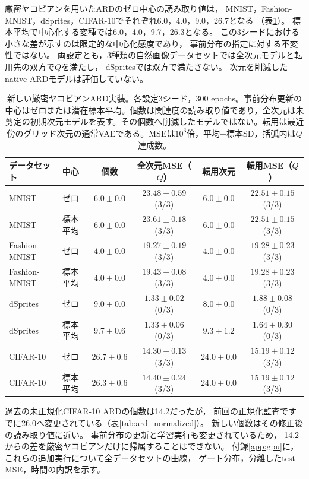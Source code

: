 \documentclass[11pt,a4paper]{ltjsarticle}
\begin{document}
厳密ヤコビアンを用いたARDのゼロ中心の読み取り値は，
MNIST，Fashion-MNIST，dSprites，CIFAR-10でそれぞれ6.0，4.0，9.0，26.7となる
（表\ref{tab:ardnew}）。
標本平均で中心化する変種では6.0，4.0，9.7，26.3となる。
この3シードにおける小さな差が示すのは限定的な中心化感度であり，
事前分布の指定に対する不変性ではない。
両設定とも，3種類の自然画像データセットでは全次元モデルと転用先の双方で$Q$を満たし，
dSpritesでは双方で満たさない。
次元を削減したnative ARDモデルは評価していない。
\begin{table}[H]
\caption{新しい厳密ヤコビアンARD実装。各設定3シード，300 epochs。事前分布更新の中心はゼロまたは潜在標本平均。個数は関連度の読み取り値であり，全次元は未剪定の初期次元モデルを表す。その個数へ削減したモデルではない。転用は最近傍のグリッド次元の通常VAEである。MSEは$10^3$倍，平均$\pm$標本SD，括弧内は$Q$達成数。}\label{tab:ardnew}
\footnotesize
\setlength{\tabcolsep}{3pt}
\begin{tabular*}{\textwidth}{@{\extracolsep{\fill}}llcccc@{}}
\toprule
データセット & 中心 & 個数 & 全次元MSE（$Q$） & 転用次元 & 転用MSE（$Q$） \\
\midrule
MNIST & ゼロ & $6.0 \pm 0.0$ & $23.48 \pm 0.59$ (3/3) & $6.0 \pm 0.0$ & $22.51 \pm 0.15$ (3/3) \\
MNIST & 標本平均 & $6.0 \pm 0.0$ & $23.61 \pm 0.18$ (3/3) & $6.0 \pm 0.0$ & $22.51 \pm 0.15$ (3/3) \\
Fashion-MNIST & ゼロ & $4.0 \pm 0.0$ & $19.27 \pm 0.19$ (3/3) & $4.0 \pm 0.0$ & $19.28 \pm 0.23$ (3/3) \\
Fashion-MNIST & 標本平均 & $4.0 \pm 0.0$ & $19.43 \pm 0.08$ (3/3) & $4.0 \pm 0.0$ & $19.28 \pm 0.23$ (3/3) \\
dSprites & ゼロ & $9.0 \pm 0.0$ & $1.33 \pm 0.02$ (0/3) & $8.0 \pm 0.0$ & $1.88 \pm 0.08$ (0/3) \\
dSprites & 標本平均 & $9.7 \pm 0.6$ & $1.33 \pm 0.06$ (0/3) & $9.3 \pm 1.2$ & $1.64 \pm 0.30$ (0/3) \\
CIFAR-10 & ゼロ & $26.7 \pm 0.6$ & $14.30 \pm 0.13$ (3/3) & $24.0 \pm 0.0$ & $15.19 \pm 0.12$ (3/3) \\
CIFAR-10 & 標本平均 & $26.3 \pm 0.6$ & $14.40 \pm 0.24$ (3/3) & $24.0 \pm 0.0$ & $15.19 \pm 0.12$ (3/3) \\
\bottomrule\end{tabular*}
\end{table}

過去の未正規化CIFAR-10 ARDの個数は14.2だったが，
前回の正規化監査ですでに26.0へ変更されている（表\ref{tab:ard_normalized}）。
新しい個数はその修正後の読み取り値に近い。
事前分布の更新と学習実行も変更されているため，
14.2からの差を厳密ヤコビアンだけに帰属することはできない。
付録\ref{app:gpu}に，これらの追加実行について全データセットの曲線，
ゲート分布，分離したtest MSE，時間の内訳を示す。
\end{document}
